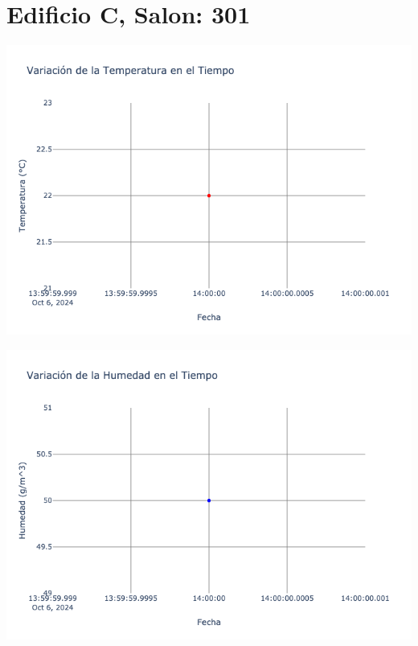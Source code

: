\documentclass{article}
\begin{document}
    \section{Edificio C, Salon: 301}
    \noindent
    \begin{minipage}{0.48\textwidth}
        \centering
        \includegraphics[width=\textwidth]{../img/poli/TS301-90Dias-03-12-2024.png}
    \end{minipage}
    \hfill
    \begin{minipage}{0.48\textwidth}
        \centering
        \includegraphics[width=\textwidth]{../img/poli/HS301-90Dias-03-12-2024.png}
    \end{minipage}
\end{document}
